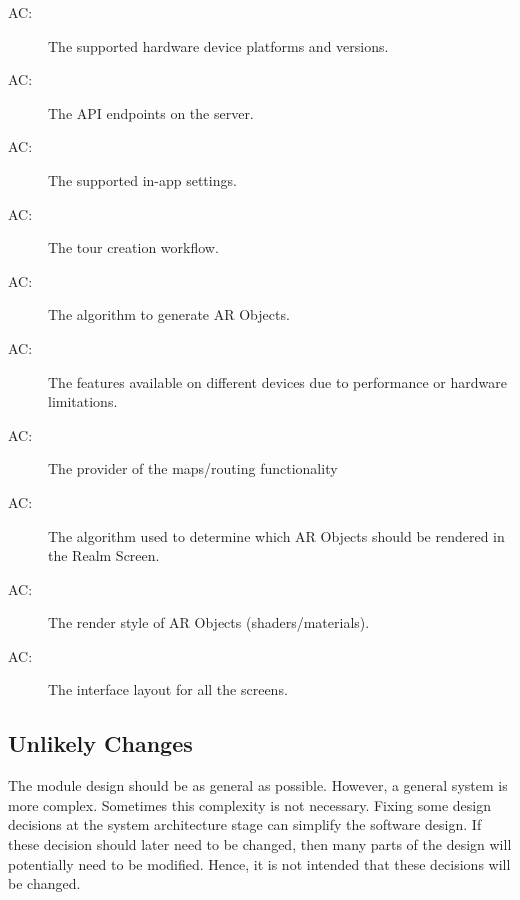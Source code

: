 \documentclass[12pt, titlepage]{article}
\newcounter{acnum}
\newcommand{\actheacnum}{AC\theacnum}
\begin{document}
\begin{description}
\item[ \actheacnum \label{acHardware}:] The supported hardware device platforms and versions.
\item[ \actheacnum \label{acAPI}:] The API endpoints on the server.
\item[ \actheacnum \label{acSettings}:] The supported in-app settings.
\item[ \actheacnum \label{acTour}:] The tour creation workflow.
\item[ \actheacnum \label{acObjectGen}:] The algorithm to generate AR Objects.
\item[ \actheacnum \label{acPerformance}:] The features available on different devices due to performance or hardware limitations.
\item[ \actheacnum \label{acMaps}:] The provider of the maps/routing functionality
\item[ \actheacnum \label{acRenderNumber}:] The algorithm used to determine which AR Objects should be rendered in the Realm Screen.
\item[ \actheacnum \label{acRenderStyle}:] The render style of AR Objects (shaders/materials).
\item[ \actheacnum \label{acInterfaces}:] The interface layout for all the screens.
\end{description}

\newpage

\subsection{Unlikely Changes} \label{SecUchange}

The module design should be as general as possible. However, a general system is
more complex. Sometimes this complexity is not necessary. Fixing some design
decisions at the system architecture stage can simplify the software design. If
these decision should later need to be changed, then many parts of the design
will potentially need to be modified. Hence, it is not intended that these
decisions will be changed.
\end{document}
